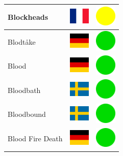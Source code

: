 \documentclass[12pt, a4paper, twoside]{report}
\begin{document}
\begin{center}
\begin{longtable}{|p{5cm}|p{2cm}|p{2cm}|}
 Blockheads                                                 & \includegraphics[width=1cm]{../img/flags/fr} &   \includegraphics[width=1cm]{../likes/m} \\ \hline
 Blodtåke                                                   & \includegraphics[width=1cm]{../img/flags/de} &   \includegraphics[width=1cm]{../likes/y} \\ \hline
 Blood                                                      & \includegraphics[width=1cm]{../img/flags/de} &   \includegraphics[width=1cm]{../likes/y} \\ \hline
 Bloodbath                                                  & \includegraphics[width=1cm]{../img/flags/se} &   \includegraphics[width=1cm]{../likes/y} \\ \hline
 Bloodbound                                                 & \includegraphics[width=1cm]{../img/flags/se} &   \includegraphics[width=1cm]{../likes/y} \\ \hline
 Blood Fire Death                                           & \includegraphics[width=1cm]{../img/flags/de} &   \includegraphics[width=1cm]{../likes/y} \\ \hline

\end{longtable}
\end{center}
\end{document}
